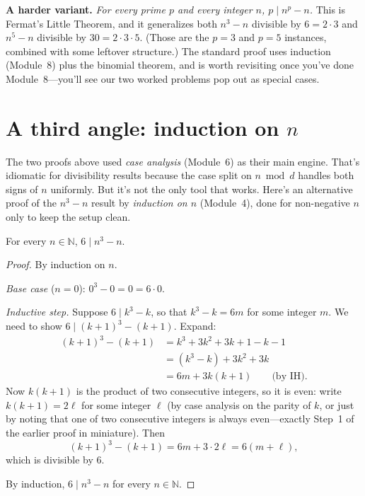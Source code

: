 \documentclass[11pt]{article}
\begin{document}
\medskip
\noindent\textbf{A harder variant.} \emph{For every prime $p$ and every integer $n$, $p \mid n^p - n$.} This is Fermat's Little Theorem, and it generalizes both $n^3 - n$ divisible by $6 = 2 \cdot 3$ and $n^5 - n$ divisible by $30 = 2 \cdot 3 \cdot 5$. (Those are the $p = 3$ and $p = 5$ instances, combined with some leftover structure.) The standard proof uses induction (Module~8) plus the binomial theorem, and is worth revisiting once you've done Module~8---you'll see our two worked problems pop out as special cases.

\section*{A third angle: induction on $n$}

The two proofs above used \emph{case analysis} (Module~6) as their main engine. That's idiomatic for divisibility results because the case split on $n \bmod d$ handles both signs of $n$ uniformly. But it's not the only tool that works. Here's an alternative proof of the $n^3 - n$ result by \emph{induction on $n$} (Module~4), done for non-negative $n$ only to keep the setup clean.

\begin{theorem}
For every $n \in \mathbb{N}$, $6 \mid n^3 - n$.
\end{theorem}

\begin{proof}
By induction on $n$.

\emph{Base case} ($n = 0$): $0^3 - 0 = 0 = 6 \cdot 0$. \checkmark

\emph{Inductive step.} Suppose $6 \mid k^3 - k$, so that $k^3 - k = 6m$ for some integer $m$. We need to show $6 \mid (k+1)^3 - (k+1)$. Expand:
\begin{align*}
  (k+1)^3 - (k+1) &= k^3 + 3k^2 + 3k + 1 - k - 1 \\
                  &= (k^3 - k) + 3k^2 + 3k \\
                  &= 6m + 3k(k + 1) \qquad \text{(by IH)}.
\end{align*}
Now $k(k+1)$ is the product of two consecutive integers, so it is even: write $k(k+1) = 2\ell$ for some integer $\ell$ (by case analysis on the parity of $k$, or just by noting that one of two consecutive integers is always even---exactly Step~1 of the earlier proof in miniature). Then
\[
  (k+1)^3 - (k+1) = 6m + 3 \cdot 2\ell = 6(m + \ell),
\]
which is divisible by $6$.

By induction, $6 \mid n^3 - n$ for every $n \in \mathbb{N}$. \qedhere
\end{proof}
\end{document}
